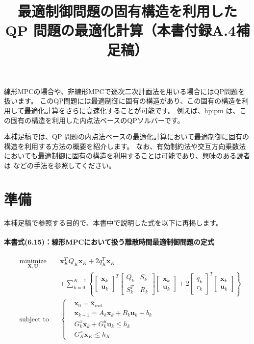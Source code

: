 \documentclass[a4paper]{jarticle}
\title{最適制御問題の固有構造を利用した QP 問題の最適化計算（本書\cite{fukatsu2024python}付録A.4補足稿）}
\begin{document}
\maketitle

線形MPCの場合や、非線形MPCで逐次二次計画法を用いる場合にはQP問題を扱います。
このQP問題には最適制御に固有の構造があり、この固有の構造を利用して最適化計算をさらに高速化することが可能です。
例えば、hpipm \cite{frison2020hpipm}は、この固有の構造を利用した内点法ベースのQPソルバーです。


本補足稿では、QP 問題の内点法ベースの最適化計算において最適制御に固有の構造を利用する方法の概要を紹介します。
なお、有効制約法や交互方向乗数法においても最適制御に固有の構造を利用することは可能であり、興味のある読者は \cite{nielsen2017low,sokoler2014input} などの手法を参照してください。

\section*{準備}
本補足稿で参照する目的で、本書\cite{fukatsu2024python}中で説明した式を以下に再掲します。

\paragraph{本書\cite{fukatsu2024python}式(6.15)：線形MPCにおいて扱う離散時間最適制御問題の定式}

\begin{equation}
\begin{aligned}
& \underset{ {\mathbf{X}},{\mathbf{U}}}{\text{minimize}} && 
\mathbf{x}_K^TQ_K\mathbf{x}_K + 2 q_K^T\mathbf{x}_K
\\
&&&
+
\sum_{k=0}^{K-1}
\left\{
\begin{bmatrix} \mathbf{x}_k \\ \mathbf{u}_k\end{bmatrix}^T
\begin{bmatrix} Q_k & S_k \\ S_k^T & R_k \end{bmatrix}
\begin{bmatrix} \mathbf{x}_k \\ \mathbf{u}_k\end{bmatrix}
+
2\begin{bmatrix} q_k \\ r_k\end{bmatrix}^T
\begin{bmatrix} \mathbf{x}_k \\ \mathbf{u}_k\end{bmatrix}
\right\}
\\
&\text{subject to} && \left \{
\begin{aligned}
    & \mathbf{x}_0 = \bar{\mathbf{x}}_{init}\\
    & \mathbf{x}_{k+1} = A_k \mathbf{x}_k + B_k \mathbf{u}_k + b_k\\
    & G^{x}_k \mathbf{x}_k + G^{u}_k\mathbf{u}_k \le h_k\\
    & G^{x}_K\mathbf{x}_K\le h_K
\end{aligned}
\right .
\end{aligned}
\label{eq:ocp_qp}
\end{equation}
\end{document}
